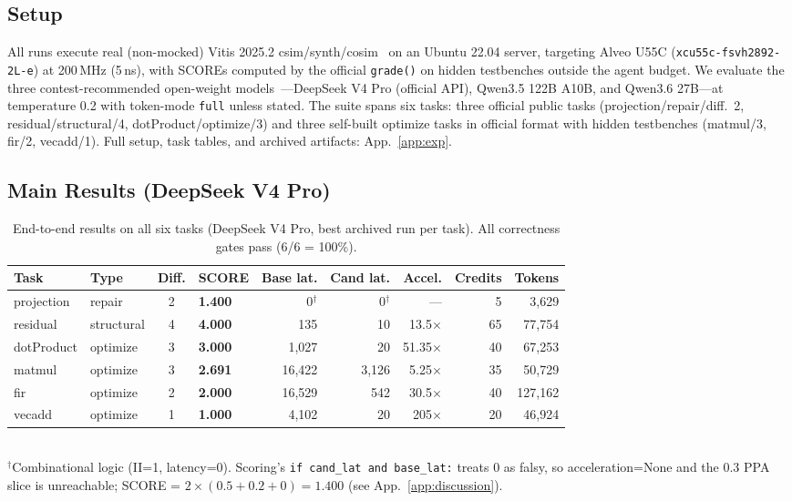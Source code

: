 \documentclass[10pt,conference,letterpaper]{IEEEtran}
\begin{document}
\subsection{Setup}

All runs execute real (non-mocked) Vitis 2025.2 csim/synth/cosim~\cite{ug1399} on an Ubuntu 22.04 server, targeting Alveo U55C (\texttt{xcu55c-fsvh2892-2L-e}) at 200\,MHz (5\,ns), with SCOREs computed by the official \texttt{grade()} on hidden testbenches outside the agent budget. We evaluate the three contest-recommended open-weight models~\cite{fpt26rules,deepseek,qwen}---DeepSeek V4 Pro (official API), Qwen3.5 122B A10B, and Qwen3.6 27B---at temperature 0.2 with token-mode \texttt{full} unless stated. The suite spans six tasks: three official public tasks (projection/repair/diff.\ 2, residual/structural/4, dotProduct/optimize/3) and three self-built optimize tasks in official format with hidden testbenches (matmul/3, fir/2, vecadd/1). Full setup, task tables, and archived artifacts: App.~\ref{app:exp}.

\subsection{Main Results (DeepSeek V4 Pro)}

\begin{table}[t]
\centering
\caption{End-to-end results on all six tasks (DeepSeek V4 Pro, best archived run per task). All correctness gates pass (6/6 = 100\%).}
\label{tab:results}
\footnotesize
\begin{tabular}{llclrrrrr}
\toprule
\textbf{Task} & \textbf{Type} & \textbf{Diff.} & \textbf{SCORE} & \textbf{Base lat.} & \textbf{Cand lat.} & \textbf{Accel.} & \textbf{Credits} & \textbf{Tokens} \\
\midrule
projection & repair & 2 & \textbf{1.400} & 0$^\dagger$ & 0$^\dagger$ & --- & 5 & 3,629 \\
residual & structural & 4 & \textbf{4.000} & 135 & 10 & 13.5$\times$ & 65 & 77,754 \\
dotProduct & optimize & 3 & \textbf{3.000} & 1,027 & 20 & 51.35$\times$ & 40 & 67,253 \\
matmul & optimize & 3 & \textbf{2.691} & 16,422 & 3,126 & 5.25$\times$ & 35 & 50,729 \\
fir & optimize & 2 & \textbf{2.000} & 16,529 & 542 & 30.5$\times$ & 40 & 127,162 \\
vecadd & optimize & 1 & \textbf{1.000} & 4,102 & 20 & 205$\times$ & 20 & 46,924 \\
\bottomrule
\end{tabular}
\\[3pt]
\footnotesize $^\dagger$Combinational logic (II=1, latency=0). Scoring's \texttt{if cand\_lat and base\_lat:} treats 0 as falsy, so acceleration=None and the 0.3 PPA slice is unreachable; SCORE = $2\times(0.5+0.2+0)=1.400$ (see App.~\ref{app:discussion}).
\end{table}
\end{document}
